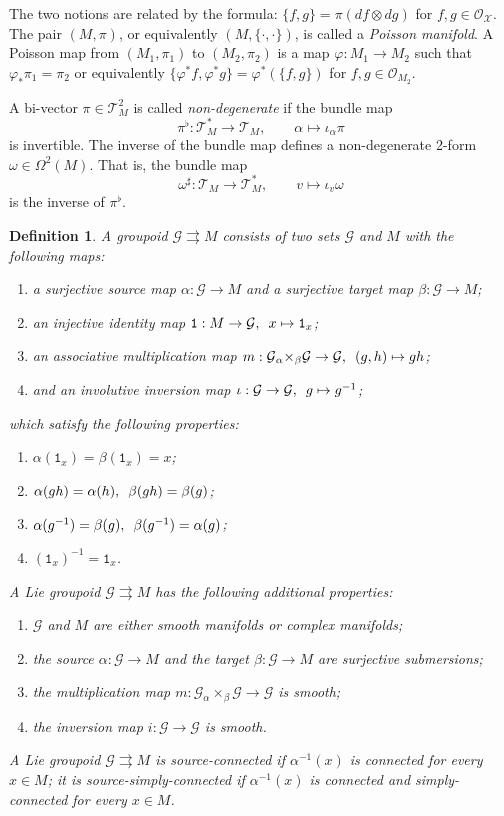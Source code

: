 \documentclass{amsart}
\newtheorem{definition}[theorem]{Definition}
\numberwithin{equation}{section}
\newcommand{\cG}{\mathcal{G}}
\newcommand{\cO}{\mathcal{O}}
\newcommand{\cX}{\mathcal{X}}
\newcommand{\cT}{\mathcal{T}}
\begin{document}
The two notions are related by the formula: $\{f, g\} = \pi (df \otimes dg)$ for $f, g\in \cO_\cX$.
The pair $(M, \pi)$, or equivalently $(M, \{\cdot,\cdot\})$, is called a \emph{Poisson manifold}. A Poisson map from $(M_1, \pi_1)$ to $(M_2, \pi_2)$ is a map $\varphi: M_1\to M_2$ such that $\varphi_*\pi_1 = \pi_2$ or equivalently $\{\varphi^*f, \varphi^*g\} = \varphi^*(\{f, g\})$ for $f, g \in \cO_{M_2}$.

A bi-vector $\pi \in \cT^2_M$ is called \emph{non-degenerate} if the bundle map
	\[
		\pi^\flat: \cT^*_M \to \cT_M, \qquad \alpha \mapsto \iota_\alpha \pi
	\]
is invertible. The inverse of the bundle map defines a non-degenerate 2-form $\omega \in \Omega^2(M)$. That is, the bundle map
	\[
		\omega^\sharp: \cT_M \to \cT^*_M, \qquad v \mapsto \iota_v \omega
	\]
is the inverse of $\pi^\flat$.

\begin{definition}
  A \emph{groupoid} $\cG\rightrightarrows M$ consists of two sets $\cG$ and $M$ with the following maps:
  \begin{enumerate}
    \item a surjective \emph{source map} $\alpha: \cG \to M$ and a surjective \emph{target map} $\beta: \cG \to M$;
    \item an injective identity map $\mathtt{1}: M \to \cG, \enskip x \mapsto \mathtt{1}_x$;
    \item an associative multiplication map $m: \cG {_\alpha \times_\beta} \cG \to \cG, \enskip (g, h) \mapsto gh$;
    \item and an involutive inversion map $\iota: \cG \to \cG, \enskip g \mapsto g^{-1}$;
  \end{enumerate}
  which satisfy the following properties:
  \begin{enumerate}
    \item $\alpha(\mathtt{1}_x) = \beta(\mathtt{1}_x) = x$;
    \item $\alpha(gh) = \alpha(h), \enskip \beta(gh) = \beta(g)$;
    \item $\alpha(g^{-1}) = \beta(g), \enskip \beta(g^{-1}) = \alpha(g)$;
    \item $(\mathtt{1}_x)^{-1} = \mathtt{1}_x$.
  \end{enumerate}
  A \emph{Lie groupoid} $\cG \rightrightarrows M$ has the following additional properties:
  \begin{enumerate}
    \item $\cG$ and $M$ are either smooth manifolds or complex manifolds;
    \item the source $\alpha: \cG \to M$ and the target $\beta: \cG \to M$ are surjective submersions;
    \item the multiplication map $m: \cG {_\alpha \times_\beta} \cG \to \cG$ is smooth;
    \item the inversion map $i: \cG \to \cG$ is smooth.
  \end{enumerate}
  A Lie groupoid $\cG \rightrightarrows M$ is \emph{source-connected} if $\alpha^{-1}(x)$ is connected for every $x \in M$; it is \emph{source-simply-connected} if $\alpha^{-1}(x)$ is connected and simply-connected for every $x \in M$.
\end{definition}
\end{document}
